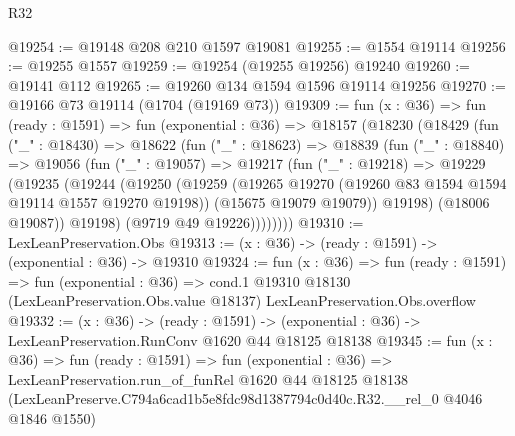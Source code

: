 \begin{lexlean}{R32}
\begin{coremodule}
@19254 := @19148 @208 @210 @1597 @19081
@19255 := @1554 @19114
@19256 := @19255 @1557
@19259 := @19254 (@19255 @19256) @19240
@19260 := @19141 @112
@19265 := @19260 @134 @1594 @1596 @19114 @19256
@19270 := @19166 @73 @19114 (@1704 (@19169 @73))
@19309 := fun (x : @36) =>
  fun (ready : @1591) =>
  fun (exponential : @36) =>
  @18157
    (@18230
      (@18429
        (fun ("_" : @18430) =>
        @18622
          (fun ("_" : @18623) =>
          @18839
            (fun ("_" : @18840) =>
            @19056
              (fun ("_" : @19057) =>
              @19217
                (fun ("_" : @19218) =>
                @19229
                  (@19235
                    (@19244
                      (@19250
                        (@19259
                          (@19265 @19270 (@19260 @83 @1594 @1594 @19114 @1557 @19270 @19198))
                          (@15675 @19079 @19079))
                        @19198)
                      (@18006 @19087))
                    @19198)
                  (@9719 @49 @19226))))))))
@19310 := LexLeanPreservation.Obs
@19313 := (x : @36) -> (ready : @1591) -> (exponential : @36) -> @19310
@19324 := fun (x : @36) =>
  fun (ready : @1591) =>
  fun (exponential : @36) =>
  cond.{1} @19310 @18130 (LexLeanPreservation.Obs.value @18137) LexLeanPreservation.Obs.overflow
@19332 := (x : @36) ->
  (ready : @1591) -> (exponential : @36) -> LexLeanPreservation.RunConv @1620 @44 @18125 @18138
@19345 := fun (x : @36) =>
  fun (ready : @1591) =>
  fun (exponential : @36) =>
  LexLeanPreservation.run_of_funRel
    @1620
    @44
    @18125
    @18138
    (LexLeanPreserve.C794a6cad1b5e8fdc98d1387794c0d40c.R32.__rel_0 @4046 @1846 @1550)
\end{coremodule}
\end{lexlean}
